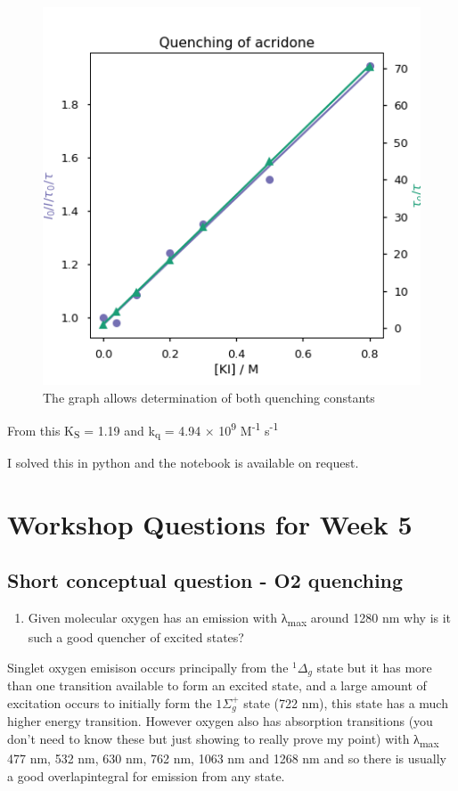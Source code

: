 \documentclass[
]{book}
\providecommand{\tightlist}{%
  \setlength{\itemsep}{0pt}\setlength{\parskip}{0pt}}
\begin{document}
\begin{figure}

{\centering \includegraphics[width=0.7\linewidth]{images/acridonequench} 

}

\caption{The graph allows determination of both quenching constants}\label{fig:acridonequench}
\end{figure}

From this K\textsubscript{S} = 1.19 and k\textsubscript{q} = 4.94 × 10\textsuperscript{9} M\textsuperscript{-1} s\textsuperscript{-1}

I solved this in python and the notebook is available on request.

\hypertarget{ch:Workshop5}{%
\chapter{Workshop Questions for Week 5}\label{ch:Workshop5}}

\hypertarget{sec:O2quench}{%
\section{Short conceptual question - O2 quenching}\label{sec:O2quench}}

\begin{enumerate}
\def\labelenumi{\arabic{enumi}.}
\tightlist
\item
  Given molecular oxygen has an emission with λ\textsubscript{max} around 1280 nm why is it such a good quencher of excited states?
\end{enumerate}

Singlet oxygen emisison occurs principally from the \(^1 \Delta _g\) state but it has more than one transition available to form an excited state, and a large amount of excitation occurs to initially form the \(1 \Sigma _g^+\) state (722 nm), this state has a much higher energy transition. However oxygen also has absorption transitions (you don't need to know these but just showing to really prove my point) with λ\textsubscript{max} 477 nm, 532 nm, 630 nm, 762 nm, 1063 nm and 1268 nm and so there is usually a good overlapintegral for emission from any state.
\end{document}
